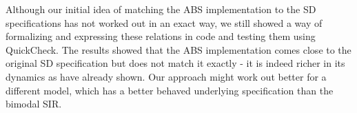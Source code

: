 Although our initial idea of matching the ABS implementation to the SD specifications has not worked out in an exact way, we still showed a way of formalizing and expressing these relations in code and testing them using QuickCheck. The results showed that the ABS implementation comes close to the original SD specification but does not match it exactly - it is indeed richer in its dynamics as \cite{macal_agent-based_2010, figueredo_comparing_2014} have already shown. Our approach might work out better for a different model, which has a better behaved underlying specification than the bimodal SIR. %